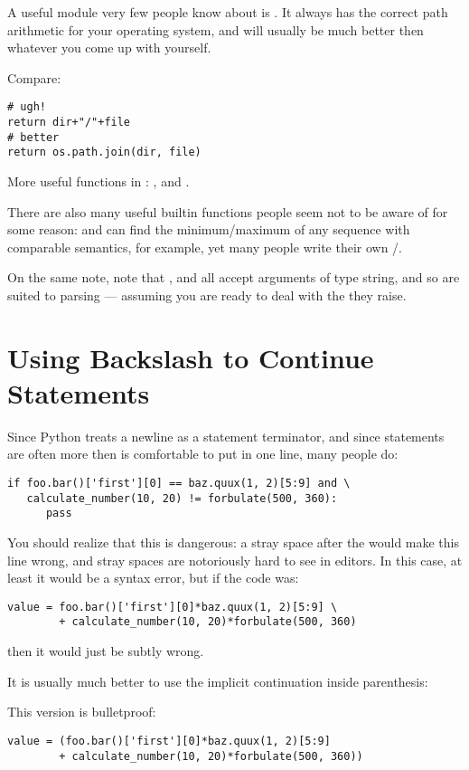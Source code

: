 \documentclass{howto}
\begin{document}
A useful module very few people know about is . It 
always has the correct path arithmetic for your operating system, and
will usually be much better then whatever you come up with yourself.

Compare:

\begin{verbatim}
# ugh!
return dir+"/"+file
# better
return os.path.join(dir, file)
\end{verbatim}

More useful functions in : , 
 and .

There are also many useful builtin functions people seem not to be
aware of for some reason:  and  can
find the minimum/maximum of any sequence with comparable semantics,
for example, yet many people write their own
/.

On the same note, note that ,  and
 all accept arguments of type string, and so are
suited to parsing --- assuming you are ready to deal with the
 they raise.

\section{Using Backslash to Continue Statements}

Since Python treats a newline as a statement terminator,
and since statements are often more then is comfortable to put
in one line, many people do:

\begin{verbatim}
if foo.bar()['first'][0] == baz.quux(1, 2)[5:9] and \
   calculate_number(10, 20) != forbulate(500, 360):
      pass
\end{verbatim}

You should realize that this is dangerous: a stray space after the
\code{\\} would make this line wrong, and stray spaces are notoriously
hard to see in editors. In this case, at least it would be a syntax
error, but if the code was:

\begin{verbatim}
value = foo.bar()['first'][0]*baz.quux(1, 2)[5:9] \
        + calculate_number(10, 20)*forbulate(500, 360)
\end{verbatim}

then it would just be subtly wrong.

It is usually much better to use the implicit continuation inside parenthesis:

This version is bulletproof:

\begin{verbatim}
value = (foo.bar()['first'][0]*baz.quux(1, 2)[5:9] 
        + calculate_number(10, 20)*forbulate(500, 360))
\end{verbatim}
\end{document}
